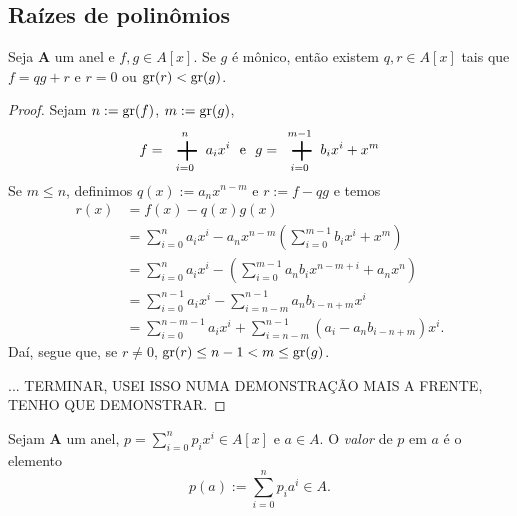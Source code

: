 

\subsection{Raízes de polinômios}

\begin{proposition}
Seja $\bm A$ um anel e $f,g \in A[x]$. Se $g$ é mônico, então existem $q,r \in A[x]$ tais que $f=qg+r$ e $r=0$ ou $\operatorname{gr}(r) < \operatorname{gr}(g)$.
\end{proposition}
\begin{proof}
Sejam $n := \operatorname{gr}(f)$, $m := \operatorname{gr}(g)$,
	\begin{equation*}
	f = \sum_{i=0}^n a_ix^i \e g = \sum_{i=0}^{m-1} b_ix^i + x^m
	\end{equation*}
Se $m \leq n$, definimos $q(x) := a_nx^{n-m}$ e $r := f-qg$ e temos
	\begin{align*}
	r(x) &= f(x) - q(x)g(x) \\
	&= \sum_{i=0}^n a_ix^i - a_nx^{n-m}\left(\sum_{i=0}^{m-1} b_ix^i + x^m\right) \\
	&= \sum_{i=0}^n a_ix^i - \left(\sum_{i=0}^{m-1} a_nb_ix^{n-m+i} + a_nx^n\right) \\
	&= \sum_{i=0}^{n-1} a_ix^i - \sum_{i=n-m}^{n-1} a_nb_{i-n+m}x^i \\
	&= \sum_{i=0}^{n-m-1} a_ix^i + \sum_{i=n-m}^{n-1} (a_i - a_nb_{i-n+m})x^i.
	\end{align*}
Daí, segue que, se $r \neq 0$, $\operatorname{gr}(r) \leq n-1 < m  \leq \operatorname{gr}(g)$.

... TERMINAR, USEI ISSO NUMA DEMONSTRAÇÃO MAIS A FRENTE, TENHO QUE DEMONSTRAR.
\end{proof}

\begin{definition}
Sejam $\bm A$ um anel, $p = \sum_{i=0}^n p_ix^i \in A[x]$ e $a \in A$. O \emph{valor} de $p$ em $a$ é o elemento
	\begin{equation*}
	p(a) := \sum_{i=0}^n p_ia^i \in A.
	\end{equation*}
\end{definition}


